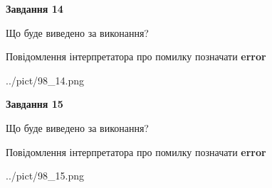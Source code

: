 \documentclass[11pt, ukrainian]{article}
\begin{document}
{\begin {large}
{\begin {center}\textbf{Завдання 14}\end {center}}\par
Що буде виведено за виконання? \par
Повідомлення інтерпретатора про помилку позначати \textbf{error}

\begin{center}
	{../pict/98_14.png}
\end{center}
\newpage

{\begin {center}\textbf{Завдання 15}\end {center}}\par
Що буде виведено за виконання? \par
Повідомлення інтерпретатора про помилку позначати \textbf{error}

\begin{center}
	{../pict/98_15.png}
\end{center}
\newpage

\end {large}}
\end{document}
